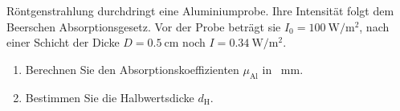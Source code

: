 \begin{ExerciseBlock}
Röntgenstrahlung durchdringt eine Aluminiumprobe. Ihre Intensität folgt dem Beerschen Absorptionsgesetz. Vor der Probe beträgt sie $I_0=\qty{100}{\watt\per\metre\squared}$, nach einer Schicht der Dicke $D=\qty{0.5}{\centi\metre}$ noch $I=\qty{0.34}{\watt\per\metre\squared}$.
\begin{enumerate}
\item Berechnen Sie den Absorptionskoeffizienten $\mu_\mathrm{Al}$ in \unit{\per\milli\metre}.
\item Bestimmen Sie die Halbwertsdicke $d_\mathrm H$.
\end{enumerate}
\end{ExerciseBlock}
